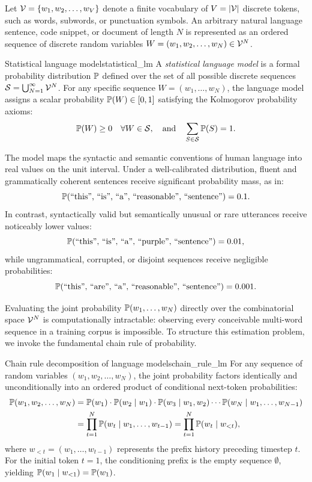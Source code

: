 \documentclass[../../main.tex]{subfiles}
\begin{document}
Let $\mathcal{V} = \{w_1, w_2, \dots, w_V\}$ denote a finite vocabulary of $V = |\mathcal{V}|$ discrete tokens, such as words, subwords, or punctuation symbols. An arbitrary natural language sentence, code snippet, or document of length $N$ is represented as an ordered sequence of discrete random variables $W = (w_1, w_2, \dots, w_N) \in \mathcal{V}^N$.

\begin{definition}{Statistical language model}{statistical_lm}
A \emph{statistical language model} is a formal probability distribution $\mathbb{P}$ defined over the set of all possible discrete sequences $\mathcal{S} = \bigcup_{N=1}^\infty \mathcal{V}^N$. For any specific sequence $W = (w_1, \dots, w_N)$, the language model assigns a scalar probability $\mathbb{P}(W) \in [0, 1]$ satisfying the Kolmogorov probability axioms:
\begin{equation}
\label{eq:total_prob}
\mathbb{P}(W) \ge 0 \quad \forall W \in \mathcal{S}, \quad \text{and} \quad \sum_{S \in \mathcal{S}} \mathbb{P}(S) = 1.
\end{equation}
\end{definition}

The model maps the syntactic and semantic conventions of human language into real values on the unit interval. Under a well-calibrated distribution, fluent and grammatically coherent sentences receive significant probability mass, as in:
\[
\mathbb{P}(\text{``this'', ``is'', ``a'', ``reasonable'', ``sentence''}) = 0.1.
\]
In contrast, syntactically valid but semantically unusual or rare utterances receive noticeably lower values:
\[
\mathbb{P}(\text{``this'', ``is'', ``a'', ``purple'', ``sentence''}) = 0.01,
\]
while ungrammatical, corrupted, or disjoint sequences receive negligible probabilities:
\[
\mathbb{P}(\text{``this'', ``are'', ``a'', ``reasonable'', ``sentence''}) = 0.001.
\]

Evaluating the joint probability $\mathbb{P}(w_1, \dots, w_N)$ directly over the combinatorial space $\mathcal{V}^N$ is computationally intractable: observing every conceivable multi-word sequence in a training corpus is impossible. To structure this estimation problem, we invoke the fundamental chain rule of probability.

\begin{definition}{Chain rule decomposition of language models}{chain_rule_lm}
For any sequence of random variables $(w_1, w_2, \dots, w_N)$, the joint probability factors identically and unconditionally into an ordered product of conditional next-token probabilities:
\begin{align}
\mathbb{P}(w_1, w_2, \dots, w_N) &= \mathbb{P}(w_1) \cdot \mathbb{P}(w_2 \mid w_1) \cdot \mathbb{P}(w_3 \mid w_1, w_2) \cdots \mathbb{P}(w_N \mid w_1, \dots, w_{N-1}) \notag \\
&= \prod_{t=1}^N \mathbb{P}(w_t \mid w_1, \dots, w_{t-1}) = \prod_{t=1}^N \mathbb{P}(w_t \mid w_{<t}), \label{eq:chain_rule_exact}
\end{align}
where $w_{<t} = (w_1, \dots, w_{t-1})$ represents the prefix history preceding timestep $t$. For the initial token $t=1$, the conditioning prefix is the empty sequence $\emptyset$, yielding $\mathbb{P}(w_1 \mid w_{<1}) = \mathbb{P}(w_1)$.
\end{definition}
\end{document}
